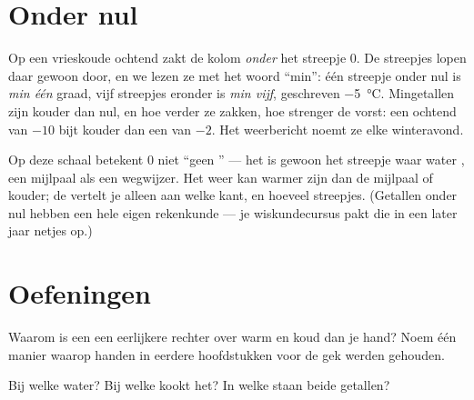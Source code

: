\section{Onder nul}

\begin{example}[Wintergetallen]\label{ex:g3:temperature-thermometers:belowzero}
Op een vrieskoude ochtend zakt de kolom \emph{onder} het streepje $0$.
De streepjes lopen daar gewoon door, en we lezen ze met het woord
``min'': één streepje onder nul is \emph{min één} graad, vijf
streepjes eronder is \emph{min vijf}, geschreven \qty{-5}{\celsius}.
Mingetallen zijn kouder dan nul, en hoe verder ze zakken, hoe strenger
de vorst: een ochtend van $-10$ bijt kouder dan een van $-2$. Het
weerbericht noemt ze elke winteravond.
\end{example}

\begin{remark}\label{rem:g3:temperature-thermometers:zero}
Op deze schaal betekent $0$ niet ``geen '' --- het is
gewoon het streepje waar water , een mijlpaal als een
wegwijzer. Het weer kan warmer zijn dan de mijlpaal of kouder; de
 vertelt je alleen aan welke kant, en hoeveel streepjes.
(Getallen onder nul hebben een hele eigen rekenkunde --- je
wiskundecursus pakt die in een later jaar netjes op.)
\end{remark}

\section{Oefeningen}

\begin{exercise}[$\star$]\label{exo:g3:temperature-thermometers:1}
Waarom is een  een eerlijkere rechter over warm en koud dan
je hand? Noem één manier waarop handen in eerdere hoofdstukken voor de
gek werden gehouden.
\end{exercise}

\begin{exercise}[$\star$]\label{exo:g3:temperature-thermometers:2}
Bij welke   water? Bij welke kookt het? In welke
 staan beide getallen?
\end{exercise}

